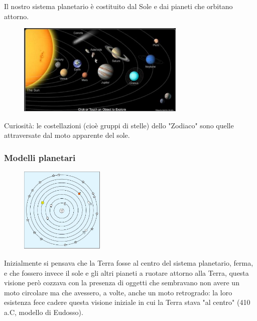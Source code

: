 Il nostro sistema planetario è costituito dal Sole e dai pianeti che orbitano attorno.

\begin{figure}[H]
    \centering
    \includegraphics[width=8cm]{2dic/Sistema_Solare.jpg}
    \label{fig:SistSol}
\end{figure}

Curiosità: le costellazioni (cioè gruppi di stelle) dello "Zodiaco" sono quelle attraversate dal moto apparente del sole.

\subsubsection{Modelli planetari}

\begin{minipage}{0.295\textwidth}
    \begin{figure}[H]
        \centering
        \includegraphics[width=4cm]{2dic/Modello_Planetario_Eudosso.jpg}
        \label{fig:MPE}
    \end{figure}
\end{minipage}
\begin{minipage}{0.6\textwidth}
    Inizialmente si pensava che la Terra fosse al centro del sistema planetario, ferma, e che fossero invece il sole e gli altri pianeti a ruotare attorno alla Terra, questa visione però cozzava con la presenza di oggetti che sembravano non avere un moto circolare ma che avessero, a volte, anche un moto retrogrado: la loro esistenza fece cadere questa visione iniziale in cui la Terra stava "al centro" (410 a.C, modello di Eudosso).
\end{minipage}

